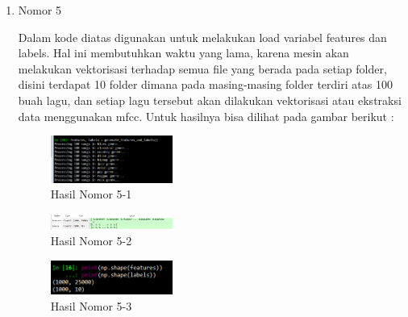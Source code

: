 \begin{enumerate}
\item Nomor 5
\hfill\break
	
Dalam kode diatas digunakan untuk melakukan load variabel features dan labels. Hal ini membutuhkan waktu yang lama, karena mesin akan melakukan vektorisasi terhadap semua file yang berada pada setiap folder, disini terdapat 10 folder dimana pada masing-masing folder terdiri atas 100 buah lagu, dan setiap lagu tersebut akan dilakukan vektorisasi atau ekstraksi data menggunakan mfcc. Untuk hasilnya bisa dilihat pada gambar berikut :
\hfill\break
	\begin{figure}[H]
		\includegraphics[width=4cm]{figures/1174054/6/24.png}
		\centering
		\caption{Hasil Nomor 5-1}
	\end{figure}
	\begin{figure}[H]
		\includegraphics[width=4cm]{figures/1174054/6/25.png}
		\centering
		\caption{Hasil Nomor 5-2}
	\end{figure}
	\begin{figure}[H]
		\includegraphics[width=4cm]{figures/1174054/6/26.png}
		\centering
		\caption{Hasil Nomor 5-3}
	\end{figure}
	

\end{enumerate}
